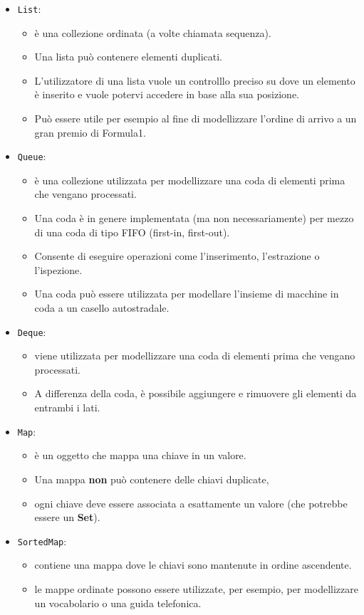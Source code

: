 \documentclass{article}
\begin{document}
\begin{itemize}
\item \texttt{List}: 
\begin{itemize}
\item \`e una collezione ordinata (a volte chiamata sequenza). 
\item Una lista pu\`o contenere elementi duplicati.
\item  L'utilizzatore di una lista vuole un controlllo preciso su dove un elemento \`e inserito e vuole potervi accedere in base alla sua posizione. 
\item Pu\`o essere utile per esempio al fine di modellizzare l'ordine di arrivo a un gran premio di Formula1.
\end{itemize}
\item \texttt{Queue}: 
\begin{itemize}
\item \`e una collezione utilizzata per modellizzare una coda di elementi  prima che vengano processati. 
\item Una coda \`e in genere implementata (ma non necessariamente) per mezzo di una coda di tipo FIFO (first-in, first-out). 
\item Consente di eseguire operazioni come l'inserimento, l'estrazione o l'ispezione. 
\item Una coda pu\`o essere utilizzata per modellare l'insieme di macchine in coda a un casello autostradale.
\end{itemize}
\item \texttt{Deque}: 
\begin{itemize}
\item viene utilizzata per modellizzare una coda di elementi prima che vengano processati.
\item A differenza della coda, \`e possibile aggiungere e rimuovere gli elementi da entrambi i lati.
\end{itemize}
\item \texttt{Map}: 
\begin{itemize}
\item \`e un oggetto che mappa una chiave in un valore.
\item Una mappa \textbf{non} pu\`o contenere delle chiavi duplicate, 
\item ogni chiave deve essere associata a esattamente un valore (che potrebbe essere un \textbf{Set}). 
\end{itemize}
\item \texttt{SortedMap}: 
\begin{itemize}
\item contiene una mappa dove le chiavi sono mantenute in ordine ascendente. 
\item le mappe ordinate possono essere utilizzate, per esempio, per modellizzare un vocabolario o una guida telefonica.
\end{itemize}
\end{itemize}
\end{document}
